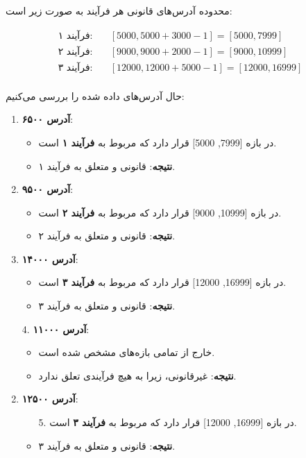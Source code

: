 \begin{qsolve}
	
	محدوده آدرس‌های قانونی هر فرآیند به صورت زیر است:
	
	\[
	\begin{aligned}
		\text{فرآیند ۱}: & \quad [5000, 5000 + 3000 - 1] = [5000, 7999] \\
		\text{فرآیند ۲}: & \quad [9000, 9000 + 2000 - 1] = [9000, 10999] \\
		\text{فرآیند ۳}: & \quad [12000, 12000 + 5000 - 1] = [12000, 16999] \\
	\end{aligned}
	\]
	
	حال آدرس‌های داده شده را بررسی می‌کنیم:
	
	\begin{enumerate}
		\item \textbf{آدرس ۶۵۰۰}:
		\begin{itemize}
			\item در بازه [7999, 5000] قرار دارد که مربوط به \textbf{فرآیند ۱} است.
			\item \textbf{نتیجه}: قانونی و متعلق به فرآیند ۱.
		\end{itemize}
		
		\item \textbf{آدرس ۹۵۰۰}:
		\begin{itemize}
			\item در بازه [10999, 9000] قرار دارد که مربوط به \textbf{فرآیند ۲} است.
			\item \textbf{نتیجه}: قانونی و متعلق به فرآیند ۲.
		\end{itemize}
				
		\item \textbf{آدرس ۱۴۰۰۰}:
		\begin{itemize}
			\item در بازه [16999, 12000] قرار دارد که مربوط به \textbf{فرآیند ۳} است.
			\item \textbf{نتیجه}: قانونی و متعلق به فرآیند ۳.
		\end{itemize}
	\end{enumerate}
\end{qsolve}

\begin{qsolve}
	\begin{enumerate}
		\item [4.] \textbf{آدرس ۱۱۰۰۰}:
		\begin{itemize}
			\item خارج از تمامی بازه‌های مشخص شده است.
			\item \textbf{نتیجه}: غیرقانونی، زیرا به هیچ فرآیندی تعلق ندارد.
		\end{itemize}
		
		\item \textbf{آدرس ۱۲۵۰۰}:
		\begin{itemize}
			\item [5.] در بازه [16999, 12000] قرار دارد که مربوط به \textbf{فرآیند ۳} است.
			\item \textbf{نتیجه}: قانونی و متعلق به فرآیند ۳.
		\end{itemize}
	\end{enumerate}
\end{qsolve}